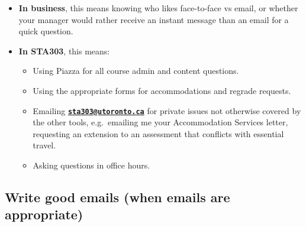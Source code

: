 \documentclass[
  openany]{book}
\providecommand{\tightlist}{%
  \setlength{\itemsep}{0pt}\setlength{\parskip}{0pt}}
\begin{document}
\begin{itemize}
\tightlist
\item
  \textbf{In business}, this means knowing who likes face-to-face vs email, or whether your manager would rather receive an instant message than an email for a quick question.
\item
  \textbf{In STA303}, this means:

  \begin{itemize}
  \tightlist
  \item
    Using Piazza for all course admin and content questions.
  \item
    Using the appropriate forms for accommodations and regrade requests.
  \item
    Emailing \textbf{\href{mailto:sta303@utoronto.ca}{\nolinkurl{sta303@utoronto.ca}}} for private issues not otherwise covered by the other tools, e.g.~emailing me your Accommodation Services letter, requesting an extension to an assessment that conflicts with essential travel.
  \item
    Asking questions in office hours.
  \end{itemize}
\end{itemize}

\hypertarget{write-good-emails-when-emails-are-appropriate}{%
\subsection{Write good emails (when emails are appropriate)}\label{write-good-emails-when-emails-are-appropriate}}
\end{document}
